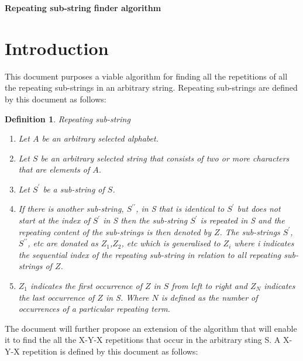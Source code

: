 \documentclass[12pt]{article}
\newtheorem{defn}{Definition}[section]
\begin{document}
\begin{center}
	\LARGE\textbf{Repeating sub-string finder algorithm}
\end{center}

\newpage
\tableofcontents
\newpage
\section{Introduction}
This document purposes a viable algorithm for finding all the repetitions of all the repeating sub-strings in an arbitrary string. Repeating sub-strings are defined by this document as follows:\\
\begin{defn}
    Repeating sub-string    
	\begin{enumerate}
		\item Let $A$ be an arbitrary selected alphabet.
		\item Let $S$ be an arbitrary selected string that consists of two or more characters that are elements of $A$.
		\item Let  $S^{\prime}$ be a sub-string of $S$.
		\item If there is another sub-string,  $S^{\prime\prime}$, in S that is identical to  $S^{\prime}$ but does not start at the index of  $S^{\prime}$ in S then the sub-string  $S^{\prime}$ is repeated in S and the repeating content of the sub-strings is then denoted by $Z$. The sub-strings $S^{\prime}$, $S^{\prime\prime}$, etc are donated as $Z_{1}$,$Z_{2}$, etc which is generalised to $Z_{i}$ where i indicates the sequential index of the repeating sub-string in relation to all repeating sub-strings of $Z$.
		\item $Z_{1}$ indicates the first occurrence of $Z$ in $S$ from left to right and $Z_{N}$ indicates the last occurrence of $Z$ in S. Where $N$ is defined as the number of occurrences of a particular repeating term.  
	\end{enumerate}
\end{defn}
The document will further propose an extension of the algorithm that will enable it to find the all the X-Y-X repetitions that occur in the arbitrary sting S. A X-Y-X repetition is defined by this document as follows:   
\end{document}
